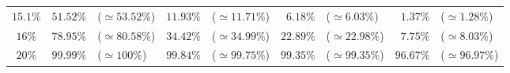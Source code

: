 \documentclass[10pt]{report}
\begin{document}
\begin{exercice}
\begin{center}
\begin{tabular}{|c|rl|rl|rl|rl|}
    
        $15.1\%$
         & 
    
        $51.52\%$
         & 
    
        ($\simeq53.52\%$)
         & 
    
        $11.93\%$
         & 
    
        ($\simeq11.71\%$)
         & 
    
        $6.18\%$
         & 
    
        ($\simeq6.03\%$)
         & 
    
        $1.37\%$
         & 
    
        ($\simeq1.28\%$)
        
    \\ 

    
        $16\%$
         & 
    
        $78.95\%$
         & 
    
        ($\simeq80.58\%$)
         & 
    
        $34.42\%$
         & 
    
        ($\simeq34.99\%$)
         & 
    
        $22.89\%$
         & 
    
        ($\simeq22.98\%$)
         & 
    
        $7.75\%$
         & 
    
        ($\simeq8.03\%$)
        
    \\ 

    
        $20\%$
         & 
    
        $99.99\%$
         & 
    
        ($\simeq100\%$)
         & 
    
        $99.84\%$
         & 
    
        ($\simeq99.75\%$)
         & 
    
        $99.35\%$
         & 
    
        ($\simeq99.35\%$)
         & 
    
        $96.67\%$
         & 
    
        ($\simeq96.97\%$)
        
    \\ \cline{1-9}

    \end{tabular}

\end{center}


\end{exercice}
\end{document}
